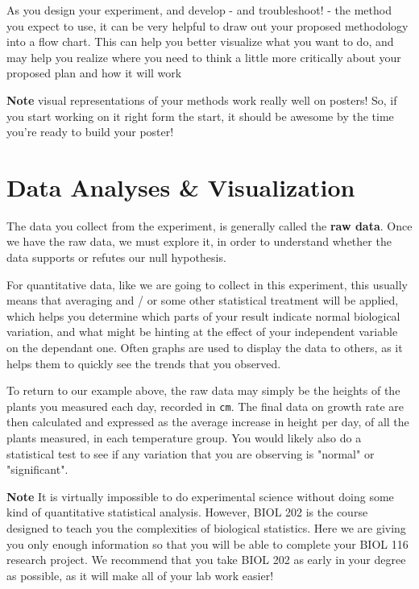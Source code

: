 \documentclass[
]{book}
\begin{document}
As you design your experiment, and develop - and troubleshoot! - the method you expect to use, it can be very helpful to draw out your proposed methodology into a flow chart. This can help you better visualize what you want to do, and may help you realize where you need to think a little more critically about your proposed plan and how it will work

\textbf{Note} visual representations of your methods work really well on posters! So, if you start working on it right form the start, it should be awesome by the time you're ready to build your poster!

\hypertarget{data-analyses-visualization}{%
\section*{Data Analyses \& Visualization}\label{data-analyses-visualization}}

The data you collect from the experiment, is generally called the \textbf{raw data}. Once we have the raw data, we must explore it, in order to understand whether the data supports or refutes our null hypothesis.

For quantitative data, like we are going to collect in this experiment, this usually means that averaging and / or some other statistical treatment will be applied, which helps you determine which parts of your result indicate normal biological variation, and what might be hinting at the effect of your independent variable on the dependant one. Often graphs are used to display the data to others, as it helps them to quickly see the trends that you observed.

To return to our example above, the raw data may simply be the heights of the plants you measured each day, recorded in \texttt{cm}. The final data on growth rate are then calculated and expressed as the average increase in height per day, of all the plants measured, in each temperature group. You would likely also do a statistical test to see if any variation that you are observing is "normal" or "significant".

\textbf{Note} It is virtually impossible to do experimental science without doing some kind of quantitative statistical analysis. However, BIOL 202 is the course designed to teach you the complexities of biological statistics. Here we are giving you only enough information so that you will be able to complete your BIOL 116 research project. We recommend that you take BIOL 202 as early in your degree as possible, as it will make all of your lab work easier!
\end{document}

